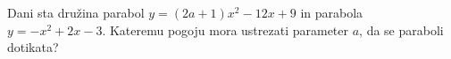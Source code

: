 \documentclass[addpoints]{exam}
\begin{document}
\begin{questions}
            \begin{solution}[10cm]

            \end{solution}













    


\newpage

    \question[5]
        Dani sta družina parabol $y=(2a+1)x^2-12x+9$ in parabola $y=-x^2+2x-3$.
        Kateremu pogoju mora ustrezati parameter $a$, da se paraboli dotikata?

            \begin{solution}[9cm]

            \end{solution}


        


\end{questions}
\end{document}
